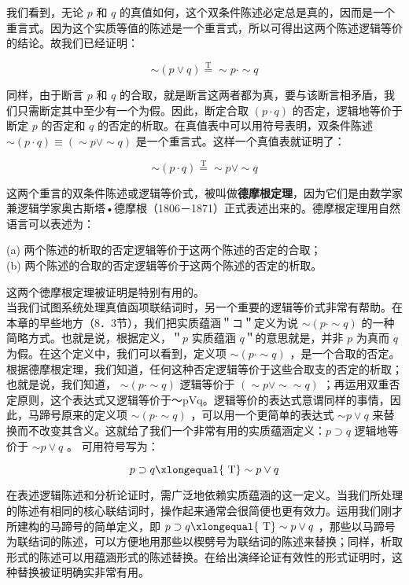 我们看到，无论 $p$ 和 $q$ 的真值如何，这个双条件陈述必定总是真的，因而是一个重言式。因为这个实质等值的陈述是一个重言式，所以可得出这两个陈述逻辑等价的结论。故我们已经证明：

$$
\sim(p \vee q) \stackrel{\mathrm{T}}{=} \sim p \cdot \sim q
$$

同样，由于断言 $p$ 和 $q$ 的合取，就是断言这两者都为真，要与该断言相矛盾，我们只需断定其中至少有一个为假。因此，断定合取 $(p \cdot q)$ 的否定，逻辑地等价于断定 $p$ 的否定和 $q$ 的否定的析取。在真值表中可以用符号表明，双条件陈述 $\sim(p \cdot q) \equiv(\sim p \vee \sim q)$ 是一个重言式。这样一个真值表就证明了：

$$
\sim(p \cdot q) \stackrel{\mathrm{T}}{=} \sim p \vee \sim q
$$

这两个重言的双条件陈述或逻辑等价式，被叫做\textbf{德摩根定理}，因为它们是由数学家兼逻辑学家奥古斯塔•德摩根（1806－1871）正式表述出来的。德摩根定理用自然语言可以表述为：

(a) 两个陈述的析取的否定逻辑等价于这两个陈述的否定的合取；\\
(b) 两个陈述的合取的否定逻辑等价于这两个陈述的否定的析取。

这两个徳摩根定理被证明是特别有用的。\\
当我们试图系统处理真值函项联结词时，另一个重要的逻辑等价式非常有帮助。在本章的早些地方（8．3节），我们把实质蕴涵＂コ＂定义为说 $\sim(p \cdot \sim q)$ 的一种简略方式。也就是说，根据定义，＂$p$ 实质蕴涵 $q$＂的意思就是，并非 $p$ 为真而 $q$ 为假。在这个定义中，我们可以看到，定义项 $\sim(p \cdot \sim q)$ ，是一个合取的否定。根据德摩根定理，我们知道，任何这种否定逻辑等价于这些合取支的否定的析取；也就是说，我们知道， $\sim(p \cdot \sim q)$ 逻辑等价于 $(\sim p \vee \sim \sim q)$ ；再运用双重否定原则，这个表达式又逻辑等价于～pVq。逻辑等价的表达式意谓同样的事情，因此，马蹄号原来的定义项 $\sim(p \cdot \sim q)$ ，可以用一个更简单的表达式 $\sim p \vee q$ 来替换而不改变其含义。这就给了我们一个非常有用的实质蕴涵定义：$p \supset q$ 逻辑地等价于 $\sim p \vee q$ 。 可用符号写为：

$$
p \supset q \xlongequal{\mathrm{~T}} \sim p \vee q
$$

在表述逻辑陈述和分析论证时，需广泛地依赖实质蕴涵的这一定义。当我们所处理的陈述有相同的核心联结词时，操作起来通常会很简便也更有效力。运用我们刚才所建构的马蹄号的简单定义，即 $p \supset q \xlongequal{\mathrm{~T}} \sim p \vee q$ ，那些以马蹄号为联结词的陈述，可以方便地用那些以楔劈号为联结词的陈述来替换；同样，析取形式的陈述可以用蕴涵形式的陈述替换。在给出演绎论证有效性的形式证明时，这种替换被证明确实非常有用。

